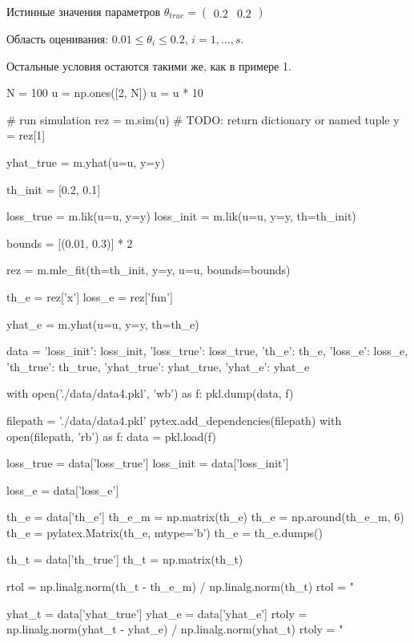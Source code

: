 \documentclass[a4paper,14pt]{extarticle}
\begin{document}
Истинные значения параметров
$\theta_{true} = \begin{pmatrix} 0.2 & 0.2 \end{pmatrix}$

Область оценивания: $0.01 \le \theta_i \le 0.2$, $i = 1, \ldots, s$.

Остальные условия остаются такими же, как в примере 1.

\begin{pycode}[model4]
N = 100
u = np.ones([2, N])
u = u * 10

# run simulation
rez = m.sim(u)  # TODO: return dictionary or named tuple
y = rez[1]

yhat_true = m.yhat(u=u, y=y)

th_init = [0.2, 0.1]

loss_true = m.lik(u=u, y=y)
loss_init = m.lik(u=u, y=y, th=th_init)

bounds = [(0.01, 0.3)] * 2

rez = m.mle_fit(th=th_init, y=y, u=u, bounds=bounds)

th_e = rez['x']
loss_e = rez['fun']

yhat_e = m.yhat(u=u, y=y, th=th_e)

data = {'loss_init': loss_init,
        'loss_true': loss_true,
        'th_e': th_e,
        'loss_e': loss_e,
        'th_true': th_true,
        'yhat_true': yhat_true,
        'yhat_e': yhat_e}

with open('./data/data4.pkl', 'wb') as f:
    pkl.dump(data, f)
\end{pycode}

\begin{pycode}
filepath = './data/data4.pkl'
pytex.add_dependencies(filepath)
with open(filepath, 'rb') as f:
  data = pkl.load(f)

loss_true = data['loss_true']
loss_init = data['loss_init']

loss_e = data['loss_e']

th_e = data['th_e']
th_e_m = np.matrix(th_e)
th_e = np.around(th_e_m, 6)
th_e = pylatex.Matrix(th_e, mtype='b')
th_e = th_e.dumps()

th_t = data['th_true']
th_t = np.matrix(th_t)

rtol = np.linalg.norm(th_t - th_e_m) / np.linalg.norm(th_t)
rtol = "%

yhat_t = data['yhat_true']
yhat_e = data['yhat_e']
rtoly = np.linalg.norm(yhat_t - yhat_e) / np.linalg.norm(yhat_t)
rtoly = "%
\end{pycode}
\end{document}
